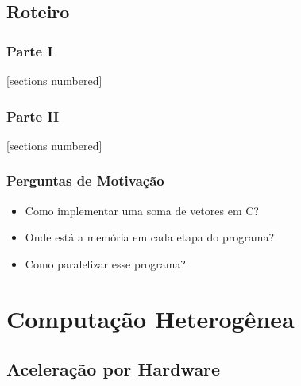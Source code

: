 \documentclass[10pt, compress, aspectratio=43, xcolor={table,usenames,dvipsnames}]{beamer}
\begin{document}
\subsection{Roteiro}

\begin{frame}
    \frametitle{Parte I}
    [sections numbered]
    \tableofcontents[hideallsubsections, part=1]
\end{frame}

\begin{frame}
    \frametitle{Parte II}
    [sections numbered]
    \tableofcontents[hideallsubsections, part=2]
\end{frame}

%

\begin{frame}[t]
    \frametitle{Perguntas de Motivação}
    \begin{itemize}
      \item Como implementar uma \alert{soma de vetores em C}?
        \pause
      \item Onde está a \alert{memória} em cada etapa do programa?
        \pause
      \item Como \alert{paralelizar} esse programa?
        \pause
    \end{itemize}
\end{frame}

\section{Computação Heterogênea}

\subsection{Aceleração por Hardware}
\end{document}
